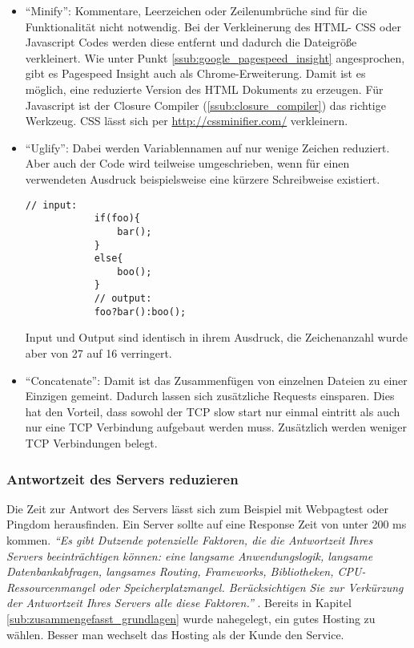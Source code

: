 				\begin{itemize}
					\item "`Minify"': Kommentare, Leerzeichen oder Zeilenumbrüche sind für die Funktionalität nicht notwendig. Bei der Verkleinerung des HTML- CSS oder Javascript Codes werden diese entfernt und dadurch die Dateigröße verkleinert. Wie unter Punkt \ref{ssub:google_pagespeed_insight} angesprochen, gibt es Pagespeed Insight auch als Chrome-Erweiterung. Damit ist es möglich, eine reduzierte Version des HTML Dokuments zu erzeugen. Für Javascript ist der Closure Compiler (\ref{ssub:closure_compiler}) das richtige Werkzeug. CSS lässt sich per \url{http://cssminifier.com/} verkleinern.
					\item "`Uglify"': Dabei werden Variablennamen auf nur wenige Zeichen reduziert. Aber auch der Code wird teilweise umgeschrieben, wenn für einen verwendeten Ausdruck beispielsweise eine kürzere Schreibweise existiert.

			\begin{lstlisting}[captionpos=b, caption=Beispiel: Uglify eines Ausdrucks, label=lst:uglify]
			// input:
			if(foo){
				bar();
			}
			else{
				boo();
			}
			// output:
			foo?bar():boo();
			\end{lstlisting}

					Input und Output sind identisch in ihrem Ausdruck, die Zeichenanzahl wurde aber von 27 auf 16 verringert.

					\item "`Concatenate"': Damit ist das Zusammenfügen von einzelnen Dateien zu einer Einzigen gemeint. Dadurch lassen sich zusätzliche Requests einsparen. Dies hat den Vorteil, dass sowohl der TCP slow start nur einmal eintritt als auch nur eine TCP Verbindung aufgebaut werden muss. Zusätzlich werden weniger TCP Verbindungen belegt.
				\end{itemize}


			\subsubsection{Antwortzeit des Servers reduzieren} %
			\label{ssub:antwortzeit_des_servers_reduzieren}
				Die Zeit zur Antwort des Servers lässt sich zum Beispiel mit Webpagtest oder Pingdom herausfinden. Ein Server sollte auf eine Response Zeit von unter 200 ms kommen. \textit{"`Es gibt Dutzende potenzielle Faktoren, die die Antwortzeit Ihres Servers beeinträchtigen können: eine langsame Anwendungslogik, langsame Datenbankabfragen, langsames Routing, Frameworks, Bibliotheken, CPU-Ressourcenmangel oder Speicherplatzmangel. Berücksichtigen Sie zur Verkürzung der Antwortzeit Ihres Servers alle diese Faktoren."'} \autocite{google15}. Bereits in Kapitel \ref{sub:zusammengefasst_grundlagen} wurde nahegelegt, ein gutes Hosting zu wählen. Besser man wechselt das Hosting als der Kunde den Service.

